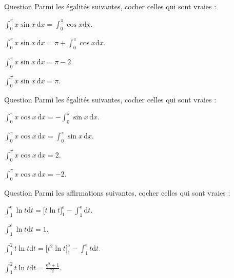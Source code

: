 \begin{multi}{Question}
Parmi les égalités suivantes, cocher celles qui sont vraies :

    \item \(\displaystyle \int _0^{\pi}x\sin x\,\mathrm{d}x=\int _0^{\pi}\cos x\mathrm{d}x\).
    \item* \(\displaystyle \int _0^{\pi}x\sin x\,\mathrm{d}x=\pi +\int _0^{\pi}\cos x\mathrm{d}x\).
    \item \(\displaystyle \int _0^{\pi}x\sin x\,\mathrm{d}x=\pi -2\).
    \item* \(\displaystyle \int _0^{\pi}x\sin x\,\mathrm{d}x=\pi\).
\end{multi}


\begin{multi}{Question}
Parmi les égalités suivantes, cocher celles qui sont vraies :

    \item* \(\displaystyle \int _0^{\pi}x\cos x\,\mathrm{d}x=-\int _0^{\pi}\sin x\,\mathrm{d}x\).
    \item \(\displaystyle \int _0^{\pi}x\cos x\,\mathrm{d}x=\int _0^{\pi}\sin x\,\mathrm{d}x\).
    \item \(\displaystyle \int _0^{\pi}x\cos x\,\mathrm{d}x=2\).
    \item* \(\displaystyle \int _0^{\pi}x\cos x\,\mathrm{d}x=-2\).
\end{multi}


\begin{multi}{Question}
Parmi les affirmations suivantes, cocher celles qui sont vraies :

    \item* \(\displaystyle \int _1^{\mathrm{e}}\ln t\mathrm{d}t=\Big[t\ln t\Big]_1^{\mathrm{e}}-\int _1^{\mathrm{e}}\mathrm{d}t\).
    \item* \(\displaystyle \int _1^{\mathrm{e}}\ln t\mathrm{d}t=1\).
    \item \(\displaystyle \int _1^{2}t\ln t\mathrm{d}t=\Big[t^2\ln t\Big]_1^{\mathrm{e}}-\int _1^{\mathrm{e}}t\mathrm{d}t\).
    \item \(\displaystyle \int _1^{2}t\ln t\mathrm{d}t=\frac{\mathrm{e}^2+1}{2}\).
\end{multi}


